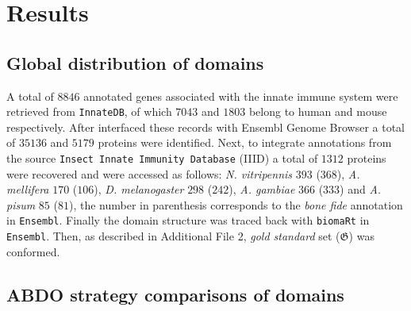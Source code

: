 \documentclass[11pt]{article}
\begin{document}
\section*{Results}

\subsection*{Global distribution of domains}

A total of $8846$ annotated genes associated with the innate immune system were retrieved 
from \texttt{InnateDB}, of which $7043$ and $1803$ belong to human and mouse 
respectively. After interfaced these records with Ensembl Genome Browser a total 
of $35136$ and $5179$ proteins were identified. Next, to integrate annotations from
the source \texttt{Insect Innate Immunity Database} (IIID) a total of $1312$ proteins were
recovered and were accessed as follows: \textsl{N. vitripennis} $393$ ($368$), 
\textsl{A. mellifera} $170$ ($106$), \textsl{D. melanogaster} $298$ ($242$), \textsl{A. gambiae}
$366$ ($333$) and \textsl{A. pisum} $85$ ($81$), the number in parenthesis corresponds to 
the \textsl{bone fide} annotation in \texttt{Ensembl}. Finally the domain structure was 
traced back with \texttt{biomaRt} in \texttt{Ensembl}. Then, as described in Additional 
File 2, \textsl{gold standard} set ($\boldsymbol{\mathfrak{G}}$) was conformed.

\subsection*{\textbf{ABDO} strategy comparisons of domains}\label{subODB}
\end{document}
